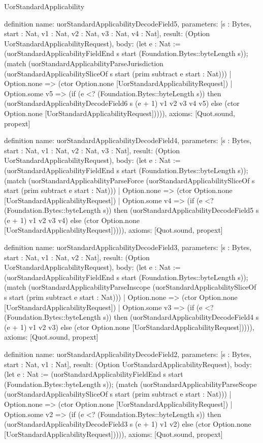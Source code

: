 \begin{lexlean}{UorStandardApplicability}
\begin{semanticmodule}
definition{
  name: uorStandardApplicabilityDecodeField5,
  parameters: [s : Bytes, start : Nat, v1 : Nat, v2 : Nat, v3 : Nat, v4 : Nat],
  result: (Option UorStandardApplicabilityRequest),
  body: (let e : Nat := (uorStandardApplicabilityFieldEnd s start (Foundation.Bytes::byteLength s)); (match (uorStandardApplicabilityParseJurisdiction (uorStandardApplicabilitySliceOf s start (prim subtract e start : Nat)))
    | Option.none => (ctor Option.none [UorStandardApplicabilityRequest])
    | Option.some v5 => (if (e <? (Foundation.Bytes::byteLength s)) then (uorStandardApplicabilityDecodeField6 s (e + 1) v1 v2 v3 v4 v5) else (ctor Option.none [UorStandardApplicabilityRequest])))),
  axioms: [Quot.sound, propext]
}

definition{
  name: uorStandardApplicabilityDecodeField4,
  parameters: [s : Bytes, start : Nat, v1 : Nat, v2 : Nat, v3 : Nat],
  result: (Option UorStandardApplicabilityRequest),
  body: (let e : Nat := (uorStandardApplicabilityFieldEnd s start (Foundation.Bytes::byteLength s)); (match (uorStandardApplicabilityParseForce (uorStandardApplicabilitySliceOf s start (prim subtract e start : Nat)))
    | Option.none => (ctor Option.none [UorStandardApplicabilityRequest])
    | Option.some v4 => (if (e <? (Foundation.Bytes::byteLength s)) then (uorStandardApplicabilityDecodeField5 s (e + 1) v1 v2 v3 v4) else (ctor Option.none [UorStandardApplicabilityRequest])))),
  axioms: [Quot.sound, propext]
}

definition{
  name: uorStandardApplicabilityDecodeField3,
  parameters: [s : Bytes, start : Nat, v1 : Nat, v2 : Nat],
  result: (Option UorStandardApplicabilityRequest),
  body: (let e : Nat := (uorStandardApplicabilityFieldEnd s start (Foundation.Bytes::byteLength s)); (match (uorStandardApplicabilityParseInscope (uorStandardApplicabilitySliceOf s start (prim subtract e start : Nat)))
    | Option.none => (ctor Option.none [UorStandardApplicabilityRequest])
    | Option.some v3 => (if (e <? (Foundation.Bytes::byteLength s)) then (uorStandardApplicabilityDecodeField4 s (e + 1) v1 v2 v3) else (ctor Option.none [UorStandardApplicabilityRequest])))),
  axioms: [Quot.sound, propext]
}

definition{
  name: uorStandardApplicabilityDecodeField2,
  parameters: [s : Bytes, start : Nat, v1 : Nat],
  result: (Option UorStandardApplicabilityRequest),
  body: (let e : Nat := (uorStandardApplicabilityFieldEnd s start (Foundation.Bytes::byteLength s)); (match (uorStandardApplicabilityParseScope (uorStandardApplicabilitySliceOf s start (prim subtract e start : Nat)))
    | Option.none => (ctor Option.none [UorStandardApplicabilityRequest])
    | Option.some v2 => (if (e <? (Foundation.Bytes::byteLength s)) then (uorStandardApplicabilityDecodeField3 s (e + 1) v1 v2) else (ctor Option.none [UorStandardApplicabilityRequest])))),
  axioms: [Quot.sound, propext]
}


\end{semanticmodule}
\end{lexlean}
